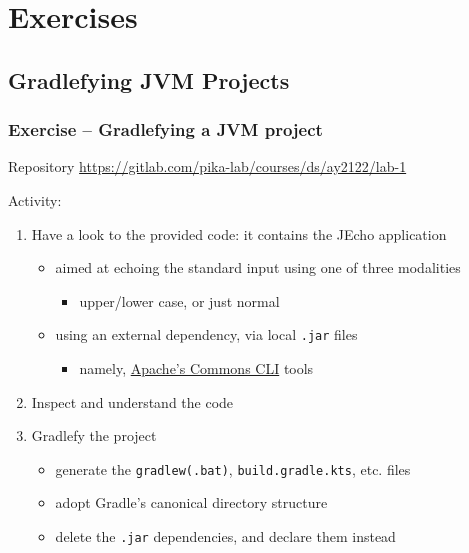 \documentclass[presentation]{beamer}\mode<presentation>{\usetheme{AMSBolognaFC}}
\begin{document}
\section{Exercises}

\subsection{Gradlefying JVM Projects}

\startExercise

\begin{frame}[allowframebreaks]
	\frametitle{Exercise \currentExercise{} -- Gradlefying a JVM project}

	\begin{block}{Repository}\centering
		\url{https://gitlab.com/pika-lab/courses/ds/ay2122/lab-1}
	\end{block}

	\bigskip

	Activity:
	\medskip
	\begin{enumerate}
		\item Have a look to the provided code: it contains the \alert{JEcho} application
		\begin{itemize}
			\item aimed at echoing the standard input using one of \alert{three modalities}
			\begin{itemize}
				\item upper/lower case, or just normal
			\end{itemize}
			\item using an external dependency, via local \texttt{.jar} files
			\begin{itemize}
				\item namely, \href{https://commons.apache.org/proper/commons-cli/}{Apache's Commons CLI} tools
			\end{itemize}
		\end{itemize}

		\medskip

		\item Inspect and understand the code

		\framebreak

		\item Gradlefy the project
		\begin{itemize}
			\item generate the \texttt{gradlew(.bat)}, \texttt{build.gradle.kts}, etc. files
			\item adopt Gradle's canonical directory structure
			\item delete the \texttt{.jar} dependencies, and declare them instead
		\end{itemize}


\end{enumerate}
\end{frame}
\end{document}
